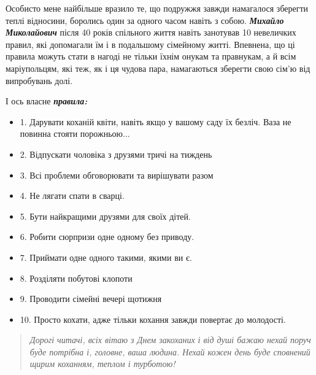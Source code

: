 
Особисто мене найбільше вразило те, що подружжя завжди намагалося зберегти
теплі відносини, боролись один за одного часом навіть з собою. \emph{\textbf{Михайло
Миколайович}} після 40 років спільного життя навіть занотував 10 невеличких
правил, які допомагали їм і в подальшому сімейному житті. Впевнена, що ці
правила можуть стати в нагоді не тільки їхнім онукам та правнукам, а й всім
маріупольцям, які теж, як і ця чудова пара, намагаються зберегти свою сім’ю від
випробувань долі.

І ось власне \emph{\textbf{правила:}}

\begin{itemize} %
\item 1. Дарувати коханій квіти, навіть якщо у вашому саду їх безліч. Ваза не повинна
стояти порожньою...

\item 2. Відпускати чоловіка з друзями тричі на тиждень

\item 3. Всі проблеми обговорювати та вирішувати разом

\item 4. Не лягати спати в сварці.

\item 5. Бути найкращими друзями для своїх дітей.

\item 6. Робити сюрпризи одне одному без приводу.

\item 7. Приймати одне одного такими, якими ви є.

\item 8. Розділяти побутові клопоти

\item 9. Проводити сімейні вечері щотижня

\item 10. Просто кохати, адже тільки кохання завжди повертає до молодості.
\end{itemize} %


\begin{quote}
\large\em Дорогі читачі, всіх вітаю з Днем закоханих і від душі бажаю нехай поруч буде
потрібна і, головне, ваша людина. Нехай кожен день буде сповнений щирим
коханням, теплом і турботою!
\end{quote}
